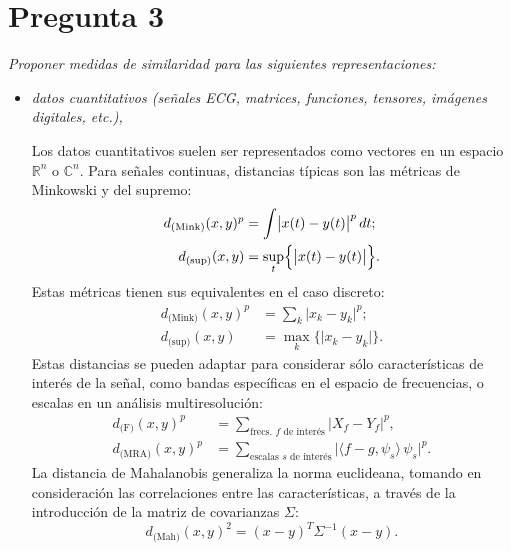 \documentclass[spanish]{article}
\newcommand{\pregunta}{\textit}
\newcommand{\abs}[1]{\lvert#1\rvert}
\newcommand{\R}{\mathbb{R}}
\newcommand{\C}{\mathbb{C}}
\begin{document}
\section*{Pregunta 3}
\pregunta{Proponer medidas de similaridad para las siguientes representaciones:}
    \begin{itemize}
        \item \pregunta{datos cuantitativos
            (señales ECG, matrices, funciones, tensores, imágenes digitales, etc.),}

            Los datos cuantitativos suelen ser representados como vectores en un espacio $\R^n$ o
            $\C^n$.  Para señales continuas, distancias típicas son las métricas de Minkowski y
            del supremo:
            \begin{align}
                d_{\text{(Mink)}}(x, y)^p &= \int\bigl\lvert x(t) - y(t)\bigr\rvert^{p}\,dt; \\
                d_{\text{(sup)}}(x, y)    &= \sup_t \Bigl\{\bigl\lvert x(t) - y(t)\bigr\rvert\Bigr\}.
            \end{align}
            Estas métricas tienen sus equivalentes en el caso discreto:
            \begin{align}
                d_{\text{(Mink)}}(x, y)^p &= \sum_k \abs{x_k - y_k}^p; \\
                d_{\text{(sup)}}(x, y)    &= \max_k\bigl\{\abs{x_k - y_k}\bigr\}.
            \end{align}
            Estas distancias se pueden adaptar para considerar sólo características de 
            interés de la
            señal, como bandas específicas en el espacio de frecuencias, o escalas en un análisis
            multiresolución:
            \begin{align}
                d_{\text{(F)}}(x, y)^p   &= 
                    \sum_{\text{frecs. $f$ de interés}} \abs{X_f - Y_f}^p, \\
                d_{\text{(MRA)}}(x, y)^p &= 
                    \sum_{\text{escalas $s$ de interés}}
                    \bigl\lvert\langle f - g, \psi_s \rangle\,\psi_s \bigr\rvert^p.
            \end{align}
            La distancia de Mahalanobis generaliza la norma euclideana, tomando en consideración las
            correlaciones entre las características, a través de la introducción de la matriz de
            covarianzas $\Sigma$:
            \begin{equation}
                d_{\text{(Mah)}}(x, y)^2 = (x - y)^T \Sigma^{-1} (x - y).
            \end{equation}


\end{itemize}
\end{document}
